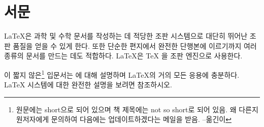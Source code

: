 

\chapter{서문}

\LaTeX\medspace\cite{manual}은 과학 및 수학 문서를 작성하는 데 적당한 조판 시스템으로
대단히 뛰어난 조판 품질을 얻을 수 있게 한다.
또한 단순한 편지에서 완전한 단행본에 이르기까지 여러 종류의 문서를 만드는 데도 적합하다.
\LaTeX{}은 \TeX{} \cite{texbook}을 조판 엔진으로 사용한다.

이 짧지 않은\footnote{원문에는 short으로 되어 있으며 책 제목에는 not so short로 되어 있음.
왜 다른지 원저자에게 문의하여 다음에는 업데이트하겠다는 메일을 받음. --옮긴이} 입문서는 \LaTeXe{}에 대해 설명하며 \LaTeX{}의 거의 모든 응용에 충분하다.
\LaTeX{} 시스템에 대한 완전한 설명을 보려면 \cite{manual,companion}\을
참조하시오.

